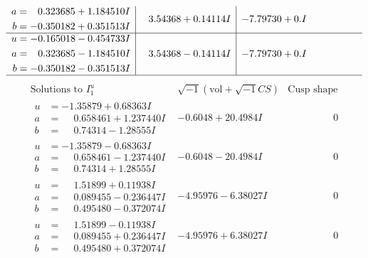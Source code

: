 \documentclass[1p]{elsarticle_modified}
\theoremstyle{definition}
\newcommand{\I}{\sqrt{-1}}
\begin{document}
$$\begin{array}{c|c|c}
\begin{aligned}
a &= \phantom{-}0.323685 + 1.184510 I \\
b &= -0.350182 + 0.351513 I\end{aligned}
 & \phantom{-}3.54368 + 0.14114 I & -7.79730 + 0. I\phantom{ +0.000000I} \\ \hline\begin{aligned}
u &= -0.165018 - 0.454733 I \\
a &= \phantom{-}0.323685 - 1.184510 I \\
b &= -0.350182 - 0.351513 I\end{aligned}
 & \phantom{-}3.54368 - 0.14114 I & -7.79730 + 0. I\phantom{ +0.000000I}\\
 \hline 
 \end{array}$$\newpage$$\begin{array}{c|c|c}  
\text{Solutions to }I^u_{1}& \I (\text{vol} + \sqrt{-1}CS) & \text{Cusp shape}\\
 \hline 
\begin{aligned}
u &= -1.35879 + 0.68363 I \\
a &= \phantom{-}0.658461 + 1.237440 I \\
b &= \phantom{-}0.74314 - 1.28555 I\end{aligned}
 & -0.6048 + 20.4984 I & \phantom{-0.000000 } 0 \\ \hline\begin{aligned}
u &= -1.35879 - 0.68363 I \\
a &= \phantom{-}0.658461 - 1.237440 I \\
b &= \phantom{-}0.74314 + 1.28555 I\end{aligned}
 & -0.6048 - 20.4984 I & \phantom{-0.000000 } 0 \\ \hline\begin{aligned}
u &= \phantom{-}1.51899 + 0.11938 I \\
a &= \phantom{-}0.089455 - 0.236447 I \\
b &= \phantom{-}0.495480 - 0.372074 I\end{aligned}
 & -4.95976 - 6.38027 I & \phantom{-0.000000 } 0 \\ \hline\begin{aligned}
u &= \phantom{-}1.51899 - 0.11938 I \\
a &= \phantom{-}0.089455 + 0.236447 I \\
b &= \phantom{-}0.495480 + 0.372074 I\end{aligned}
 & -4.95976 + 6.38027 I & \phantom{-0.000000 } 0 \\ \hline\begin{aligned}

\end{aligned}
\end{array}$$
\end{document}
